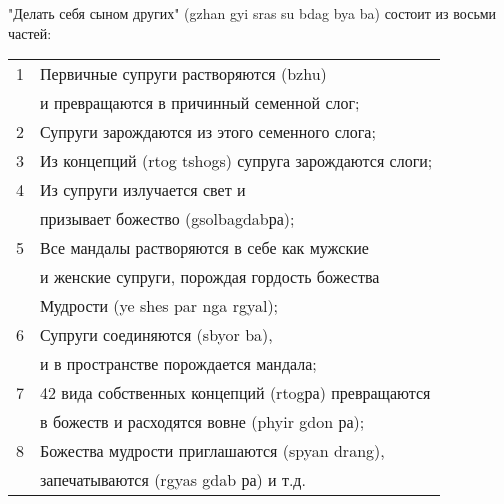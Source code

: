 "Делать себя сыном других" (gzhan gyi sras su bdag bya ba) состоит из восьми частей:\\

\begin{tabular}{ll}
1 & Первичные супруги растворяются (bzhu) \\
  & и превращаются в причинный семенной слог;\\
2 & Супруги зарождаются из этого семенного слога;\\
3 & Из концепций (rtog tshogs) супруга зарождаются слоги;\\
4 & Из супруги излучается свет и \\
  & призывает божество (gsolbagdabра);\\
5 & Все мандалы растворяются в себе как мужские \\
  & и женские супруги, порождая гордость божества \\
  & Мудрости (ye shes par nga rgyal);\\
6 & Супруги соединяются (sbyor ba), \\
  & и в пространстве порождается мандала;\\
7 & 42 вида собственных концепций (rtogра) превращаются\\
  &  в божеств и расходятся вовне (phyir gdon ра);\\
8 & Божества мудрости приглашаются (spyan drang), \\
  & запечатываются (rgyas gdab ра) и т.д.\\
\end{tabular}


